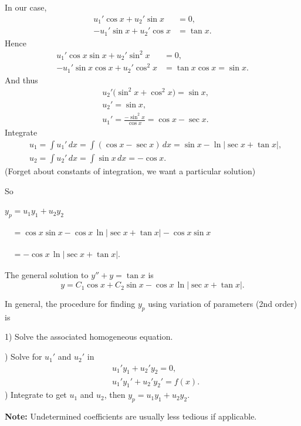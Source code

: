 \documentclass[10pt,aspectratio=169]{beamer}
\begin{document}
\begin{frame}
In our case,
\[
\begin{aligned}
u_1' \cos x + u_2' \sin x &= 0 ,\\
-u_1' \sin x + u_2' \cos x &= \tan x .
\end{aligned}
\]
\pause
Hence
\[
\begin{aligned}
u_1' \cos x \sin x + u_2' \sin^2 x & = 0 ,\\
-u_1' \sin x \cos x + u_2' \cos^2 x & = \tan x \cos x = \sin x .
\end{aligned}
\]
\pause
And thus
\[
\begin{aligned}
& u_2' \bigl(\sin^2 x + \cos^2 x\bigr) = \sin x , \\
& u_2' = \sin x , \\
& u_1' = \frac{- \sin^2 x}{\cos x} = \cos x - \sec x .
\end{aligned}
\]
\pause
Integrate %
\[
\begin{aligned}
& u_1 = \int u_1'\,dx 
= \int ( \cos x-\sec x ) \,dx
= \sin x -
\ln \left\lvert \sec x + \tan x \right\rvert
, \\
& u_2 = \int u_2'\,dx 
= \int \sin x\,dx = -\cos x .
\end{aligned}
\]
\pause
(Forget about constants of integration, we want a particular solution)

\end{frame}

\begin{frame}
So

\medskip

\quad
$
y_p = u_1 y_1 + u_2 y_2$

\pause
\medskip

\quad
$
\phantom{y_p}
=
\cos x \sin x
-
\cos x
\,
\ln \lvert
\sec x + \tan x
\rvert
-\cos x \sin x
$

\pause
\medskip

\quad
$
\phantom{y_p}
=
-
\cos x \, \ln \lvert
\sec x + \tan x
\rvert $.

\pause
\medskip

The general solution to $y'' + y = \tan x$ is
\[
y = C_1 \cos x + C_2 \sin x
-
\cos x \, \ln \lvert
\sec x + \tan x
\rvert .
\]

\medskip
\pause

In general, the procedure for finding $y_p$ using variation of parameters (2nd
order) is

1) Solve the associated homogeneous equation.

) Solve for $u_1'$ and $u_2'$ in
\[
\begin{aligned}
& u_1' y_1 + u_2' y_2 = 0 ,\\
& u_1' y_1' + u_2' y_2' = f(x) .
\end{aligned}
\]
) Integrate to get $u_1$ and $u_2$, then $y_p = u_1 y_1 + u_2 y_2$.

\medskip
\pause

\textbf{Note:} Undetermined coefficients are usually less tedious if
applicable.
\end{frame}
\end{document}
